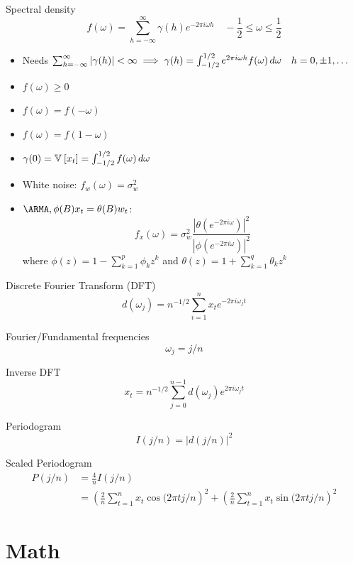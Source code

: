 \documentclass[landscape]{article}
\begin{document}
\begin{multicols*}{2}
Spectral density
$$f(\omega) = \sum_{h=-\infty}^\infty \gamma(h) e^{-2\pi i \omega h} 
\quad -\frac{1}{2} \le \omega \le \frac{1}{2}$$
\begin{itemize}
  \item Needs $\sum_{h=-\infty}^\infty |\gamma(h)| < \infty
    \;\Longrightarrow\; \gamma(h) = \int_{-1/2}^{1/2} e^{2\pi i \omega h}f(\omega) \,d\omega 
    \quad h=0,\pm1,\ldots$
  \item $f(\omega) \ge 0$
  \item $f(\omega) = f(-\omega)$
  \item $f(\omega) = f(1-\omega)$
  \item $\gamma(0) = \mathbb{V}_{}\left[x_t\right] = \int_{-1/2}^{1/2}f(\omega)\,d\omega$
  \item White noise: $f_w(\omega) = \sigma_w^2$
  \item $\ARMA, \phi(B)x_t = \theta(B)w_t$: 
    $$f_x(\omega) = \sigma_w^2 \frac{|\theta(e^{-2\pi i
    \omega})|^2}{|\phi(e^{-2\pi i \omega})|^2}$$
    where $\phi(z) = 1 - \sum_{k=1}^p \phi_k z^k$ and 
    $\theta(z) = 1 + \sum_{k=1}^q \theta_k z^k$
\end{itemize}

Discrete Fourier Transform (DFT)
$$d(\omega_j) = n^{-1/2} \sum_{i=1}^n x_t e^{-2\pi i\omega_j t}$$

Fourier/Fundamental frequencies
$$\omega_j = j/n$$

Inverse DFT
$$x_t = n^{-1/2} \sum_{j=0}^{n-1} d(\omega_j) e^{2\pi i\omega_j t}$$

Periodogram
$$I(j/n) = |d(j/n)|^2$$

Scaled Periodogram
\begin{align*}
P(j/n) 
&= \frac{4}{n}I(j/n) \\
&=\left( \frac{2}{n} \sum_{t=1}^n x_t \cos(2\pi t j/n \right)^2
+ \left( \frac{2}{n} \sum_{t=1}^n x_t \sin(2\pi t j/n \right)^2
\end{align*}

\section{Math}


\end{multicols*}
\end{document}
